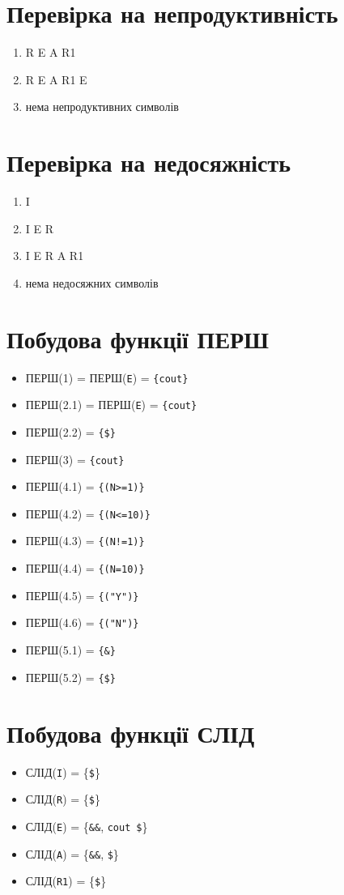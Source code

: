 \section{Перевірка на непродуктивність}
\begin{enumerate}
    \item  R E A R1
    \item  R E A R1 E
    \item  нема непродуктивних символів
\end{enumerate}

\section{Перевірка на недосяжність}
\begin{enumerate}
    \item  I
    \item  I E R
    \item  I E R A R1
    \item  нема недосяжних символів
\end{enumerate}


\newpage
\section{Побудова функції ПЕРШ}
\begin{itemize}
    \item  ПЕРШ(1) = ПЕРШ(\texttt{E}) = \texttt{\{cout\}}
    \item  ПЕРШ(2.1) = ПЕРШ(\texttt{E}) = \texttt{\{cout\}}
    \item  ПЕРШ(2.2) = \texttt{\{\$\}}
    \item  ПЕРШ(3) = \texttt{\{cout\}}
    \item  ПЕРШ(4.1) = \texttt{\{(N>=1)\}}
    \item  ПЕРШ(4.2) = \texttt{\{(N<=10)\}}
    \item  ПЕРШ(4.3) = \texttt{\{(N!=1)\}}
    \item  ПЕРШ(4.4) = \texttt{\{(N=10)\}}
    \item  ПЕРШ(4.5) = \texttt{\{("Y")\}}
    \item  ПЕРШ(4.6) = \texttt{\{("N")\}}
    \item  ПЕРШ(5.1) = \texttt{\{\&\}}
    \item  ПЕРШ(5.2) = \texttt{\{\$\}}
\end{itemize}


\section{Побудова функції СЛІД}
\begin{itemize}
    \item  СЛІД(\verb|I|) = \{\verb|$|\}
    \item  СЛІД(\verb|R|) = \{\verb|$|\}
    \item  СЛІД(\verb|E|) = \{\verb|&&|, \verb|cout|\, \verb|$|\}
    \item  СЛІД(\verb|A|) = \{\verb|&&|, \verb|$|\}
    \item  СЛІД(\verb|R1|) = \{\verb|$|\}
\end{itemize}
